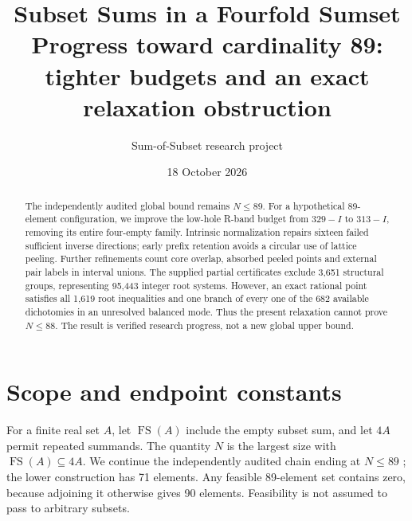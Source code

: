 \documentclass[11pt,a4paper]{article}
\title{Subset Sums in a Fourfold Sumset\\\large Progress toward cardinality 89:\\tighter budgets and an exact relaxation obstruction}
\author{Sum-of-Subset research project}\date{18 October 2026}
\newcommand{\FS}{\operatorname{FS}}\newcommand{\Z}{\mathbb Z}
\begin{document}
\maketitle
\begin{abstract}
The independently audited global bound remains $N\le89$.
For a hypothetical 89-element configuration, we improve the low-hole R-band
budget from $329-I$ to $313-I$, removing its entire four-empty family.
Intrinsic normalization repairs sixteen failed sufficient inverse directions;
early prefix retention avoids a circular use of lattice peeling.
Further refinements count core overlap, absorbed peeled points and external
pair labels in interval unions. The supplied partial certificates exclude
3,651 structural groups, representing 95,443 integer root systems.
However, an exact rational point satisfies all 1,619 root inequalities and
one branch of every one of the 682 available dichotomies in an unresolved
balanced mode. Thus the present relaxation cannot prove $N\le88$.
The result is verified research progress, not a new global upper bound.
\end{abstract}

\section{Scope and endpoint constants}
For a finite real set $A$, let $\FS(A)$ include the empty subset sum, and let
$4A$ permit repeated summands. The quantity $N$ is the largest size with
$\FS(A)\subseteq4A$. We continue the independently audited chain ending at
$N\le89$ \cite{previous}; the lower construction has 71 elements. Any feasible
89-element set contains zero, because adjoining it otherwise gives
90 elements. Feasibility is not assumed to pass to arbitrary subsets.
\end{document}
